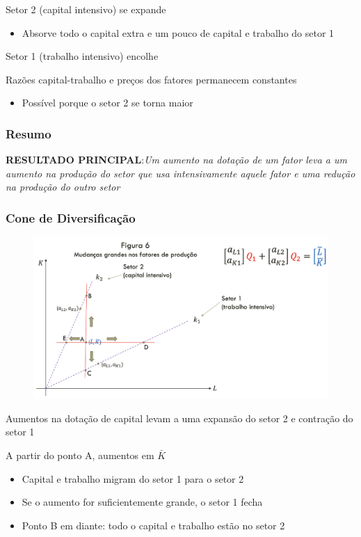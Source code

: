 \documentclass[a4paper,12pt]{article}[abntex2]
\begin{document}
Setor 2 (capital intensivo) se expande
\begin{itemize}
    \item Absorve todo o capital extra e um pouco de capital e trabalho do setor 1
\end{itemize}

Setor 1 (trabalho intensivo) encolhe

Razões capital-trabalho e preços dos fatores permanecem constantes
\begin{itemize}
    \item Possível porque o setor 2 se torna maior
\end{itemize}

\subsubsection{\textbf{Resumo}}
\textbf{RESULTADO PRINCIPAL}:\textit{Um aumento na dotação de um fator leva a um aumento na produção do setor que usa intensivamente aquele fator e uma redução na produção do outro setor}

\subsubsection{\textbf{Cone de Diversificação}}
\begin{figure}[H]
    \centering
    \includegraphics[width=0.7\linewidth]{Imagens/a11i6.png}
\end{figure}

Aumentos na dotação de capital levam a uma expansão do setor 2 e contração do setor 1

A partir do ponto A, aumentos em $\bar{K}$
\begin{itemize}
    \item Capital e trabalho migram do setor 1 para o setor 2
    \item Se o aumento for suficientemente grande, o setor 1 fecha
    \item Ponto B em diante: todo o capital e trabalho estão no setor 2
\end{itemize}
\end{document}
